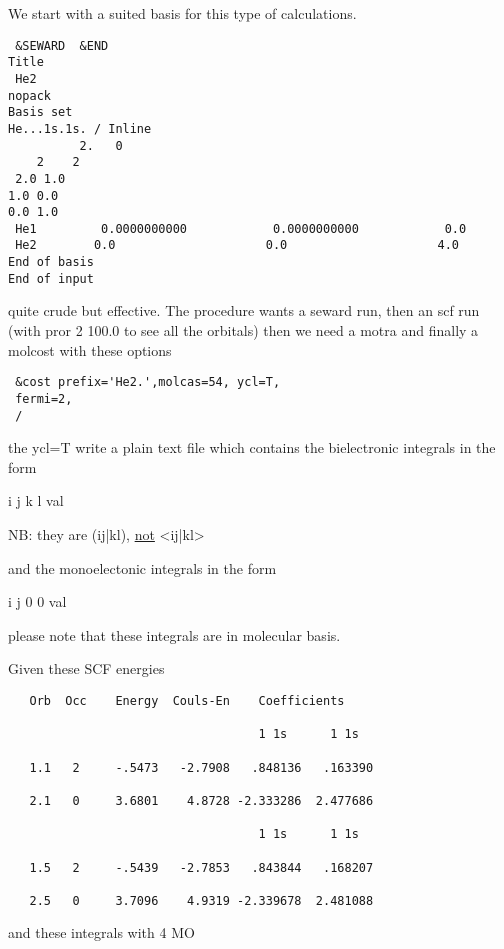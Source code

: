 \documentclass[a4paper,11pt]{report}
\begin{document}
We start with a suited basis for this type of calculations.

\begin{verbatim}
 &SEWARD  &END
Title
 He2
nopack
Basis set
He...1s.1s. / Inline
          2.   0
    2    2
 2.0 1.0
1.0 0.0
0.0 1.0
 He1         0.0000000000            0.0000000000            0.0
 He2        0.0                     0.0                     4.0
End of basis
End of input
\end{verbatim}

quite crude but effective. The procedure wants a seward run, then an scf run
(with pror 2 100.0 to see all the orbitals) then we need a motra and finally
a molcost with these options

\begin{verbatim}
 &cost prefix='He2.',molcas=54, ycl=T,
 fermi=2,
 /
\end{verbatim}

the ycl=T write a plain text file which contains the bielectronic integrals
in the form

i j k l val

NB: they are (ij|kl), \underline{not} <ij|kl>

and the monoelectonic integrals in the form

i j 0 0 val

please note that these integrals are in molecular basis. 

Given these SCF energies

\begin{verbatim}
   Orb  Occ    Energy  Couls-En    Coefficients

                                   1 1s      1 1s

   1.1   2     -.5473   -2.7908   .848136   .163390

   2.1   0     3.6801    4.8728 -2.333286  2.477686

                                   1 1s      1 1s

   1.5   2     -.5439   -2.7853   .843844   .168207

   2.5   0     3.7096    4.9319 -2.339678  2.481088
\end{verbatim}
 

and these integrals with 4 MO
\end{document}

